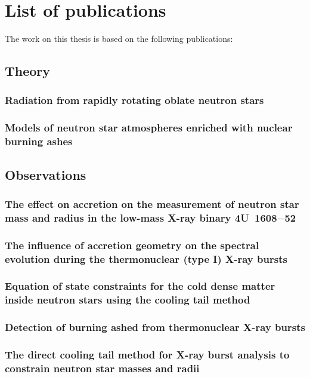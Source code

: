 \chapter*{List of publications}

The work on this thesis is based on the following publications:

\section*{Theory}
\subsection*{Radiation from rapidly rotating oblate neutron stars}

\subsection*{Models of neutron star atmospheres enriched with nuclear burning ashes}


\section*{Observations}
\subsection*{The effect on accretion on the measurement of neutron star mass and radius in the low-mass X-ray binary 4U~1608$-$52}

\subsection*{The influence of accretion geometry on the spectral evolution during the thermonuclear (type I) X-ray bursts}

\subsection*{Equation of state constraints for the cold dense matter inside neutron stars using the cooling tail method}

\subsection*{Detection of burning ashed from thermonuclear X-ray bursts}

\subsection*{The direct cooling tail method for X-ray burst analysis to constrain neutron star masses and radii}






